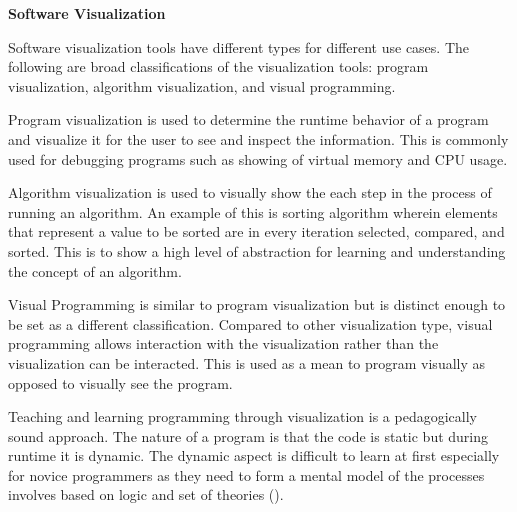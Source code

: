 \flushleft
\textbf{Software Visualization}\\
\justifying

\parx
Software visualization tools have different types for different use cases. The following
are broad classifications of the visualization tools: program visualization, algorithm
visualization, and visual programming.

\parx
Program visualization is used to determine the runtime behavior of a program and visualize
it for the user to see and inspect the information. This is commonly used for debugging
programs such as showing of virtual memory and CPU usage.

\parx
Algorithm visualization is used to visually show the each step in the process of running
an algorithm. An example of this is sorting algorithm wherein elements that represent
a value to be sorted are in every iteration selected, compared, and sorted. This is to
show a high level of abstraction for learning and understanding the concept of an
algorithm.

\parx
Visual Programming is similar to program visualization but is distinct enough to be set
as a different classification. Compared to other visualization type, visual programming
allows interaction with the visualization rather than the visualization can be interacted.
This is used as a mean to program visually as opposed to visually see the program.

\parx
Teaching and learning programming through visualization is a pedagogically sound
approach. The nature of a program is that the code is static but during runtime it is
dynamic. The dynamic aspect is difficult to learn at first especially for novice
programmers as they need to form a mental model of the processes involves based on
logic and set of theories (\cite{juha_sorva_2012}).
